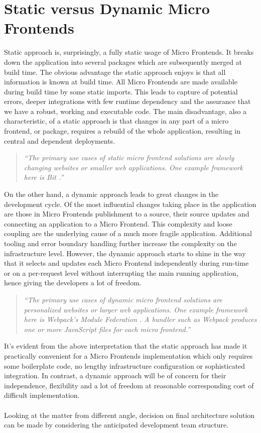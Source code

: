 \documentclass[a4paper]{book}
\begin{document}
\section{Static versus Dynamic Micro Frontends}
Static approach is, surprisingly, a fully static usage of Micro Frontends. It breaks down the application into several packages which are subsequently merged at build time. The obvious advantage the static approach enjoys is that all information is known at build time. All Micro Frontends are made available during build time by some static imports. This leads to capture of potential errors, deeper integrations with few runtime dependency and the assurance that we have a robust, working and executable code. The main disadvantage, also a characteristic, of a static approach is that changes in any part of a micro frontend, or package, requires a rebuild of the whole application, resulting in central and dependent deployments. \cite{Rap20}
\begin{quote}
    \textit{“The primary use cases of static micro frontend solutions are slowly changing websites or smaller web applications. One example framework here is Bit \cite{Bit15}.” \cite{Rap20}}
\end{quote}

On the other hand, a dynamic approach leads to great changes in the development cycle. Of the most influential changes taking place in the application are those in Micro Frontends publishment to a source, their source updates and connecting an application to a Micro Frontend. This complexity and loose coupling are the underlying cause of a much more fragile application. Additional tooling and error boundary handling further increase the complexity on the infrastructure level. However, the dynamic approach starts to shine in the way that it selects and updates each Micro Frontend independently during run-time or on a per-request level without interrupting the main running application, hence giving the developers a lot of freedom. \cite{Rap20} 
\begin{quote}
\textit{“The primary use cases of dynamic micro frontend solutions are personalized websites or larger web applications. One example framework here is Webpack's Module Federation \cite{Webpack}. A bundler such as Webpack produces one or more JavaScript files for each micro frontend.”} \cite{Rap20}
\end{quote}

It’s evident from the above interpretation that the static approach has made it practically convenient for a Micro Frontends implementation which only requires some boilerplate code, no lengthy infrastructure configuration or sophisticated integration. In contrast, a dynamic approach will be of concern for their independence, flexibility and a lot of freedom at reasonable corresponding cost of difficult implementation. 
\\ \\
Looking at the matter from different angle, decision on final architecture solution can be made by considering the anticipated development team structure.
\end{document}
